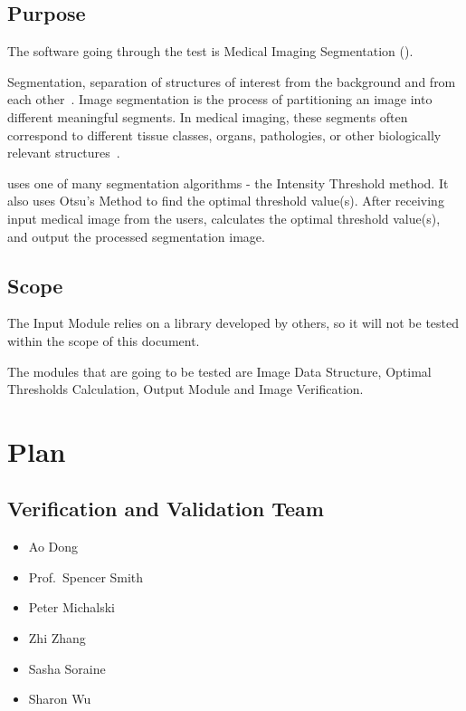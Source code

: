 \documentclass[12pt, titlepage]{article}
\begin{document}
\subsection{Purpose}

The software going through the test is Medical Imaging Segmentation
(\progname{}).

Segmentation, separation of structures of interest from the background and from
each other~\cite{Bankman2000}. Image segmentation is the process of
partitioning an image into different meaningful segments. In medical imaging,
these segments
often correspond to different tissue classes, organs, pathologies, or other
biologically relevant structures~\cite{Forouzanfar2010}.

\progname{} uses one of many segmentation algorithms - the Intensity Threshold
method. It also uses Otsu's Method to find the optimal threshold value(s).
After receiving input medical image from the users, \progname{} calculates the
optimal threshold value(s), and output the processed segmentation image.

\subsection{Scope}

The Input Module relies on a library developed by others, so it will not be
tested within the scope of this document.

The modules that are going to be tested are Image Data Structure, Optimal
Thresholds Calculation, Output Module and Image Verification.

\section{Plan}
\label{sec_plan}
	
\subsection{Verification and Validation Team}

\begin{itemize}
\item Ao Dong
\item Prof.\ Spencer Smith
\item Peter Michalski
\item Zhi Zhang
\item Sasha Soraine
\item Sharon Wu
\end{itemize}
\end{document}
